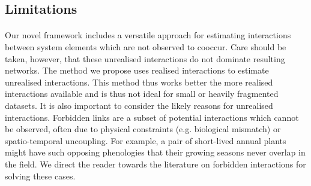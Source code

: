\documentclass[a4,12pt]{article}
\begin{document}
     


   \subsection{Limitations}


        
        \paragraph{}
        Our novel framework includes a versatile approach for estimating interactions between system elements which are not observed to cooccur. Care should be taken, however, that these unrealised interactions do not dominate resulting networks. The method we propose uses realised interactions to estimate unrealised interactions. This method thus works better the more realised interactions available and is thus not ideal for small or heavily fragmented datasets. It is also important to consider the likely reasons for unrealised interactions. Forbidden links are a subset of potential interactions which cannot be observed, often due to physical constraints (e.g. biological mismatch) or spatio-temporal uncoupling. For example, a pair of short-lived annual plants might have such opposing phenologies that their growing seasons never overlap in the field. We direct the reader towards the literature on forbidden interactions \parencite{Olesen2011, Jordano2016} for solving these cases. 

\end{document}
